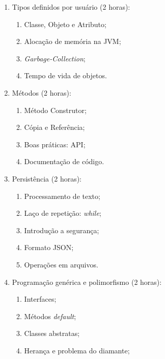 \documentclass{article}
\begin{document}
\begin{enumerate}
    \item Tipos definidos por usuário (2 horas):
        \begin{samepage}
        \begin{enumerate}
                \item Classe, Objeto e Atributo;
                \item Alocação de memória na JVM;
                \item \textit{Garbage-Collection};
                \item Tempo de vida de objetos.
        \end{enumerate}
        \end{samepage}
    \item Métodos (2 horas):
        \begin{samepage}
        \begin{enumerate}
                \item Método Construtor;
                \item Cópia e Referência;
                \item Boas práticas: API\@;
                \item Documentação de código.
        \end{enumerate}
        \end{samepage}
    \item Persistência (2 horas):
        \begin{samepage}
        \begin{enumerate}
                \item Processamento de texto;
                \item Laço de repetição: \textit{while};
                \item Introdução a segurança;
                \item Formato JSON;
                \item Operações em arquivos.
        \end{enumerate}
        \end{samepage}
    \item Programação genérica e polimorfismo (2 horas):
        \begin{samepage}
        \begin{enumerate}
                \item Interfaces;
                \item Métodos \textit{default};
                \item Classes abstratas;
                \item Herança e problema do diamante;

\end{enumerate}
\end{samepage}
\end{enumerate}
\end{document}
